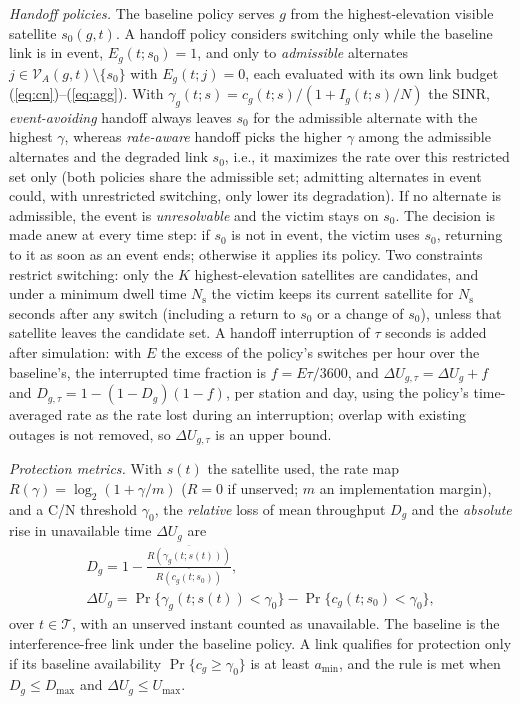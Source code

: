 \documentclass[conference]{IEEEtran}
\begin{document}
\emph{Handoff policies.} The baseline policy serves $g$ from the highest-elevation
visible satellite $s_0(g,t)$. A handoff policy considers switching only while the
baseline link is in event, $E_g(t;s_0)=1$, and only to \emph{admissible}
alternates $j \in \mathcal{V}_A(g,t)\setminus\{s_0\}$ with $E_g(t;j)=0$, each
evaluated with its own link budget (\ref{eq:cn})--(\ref{eq:agg}). With
$\gamma_g(t;s) = c_g(t;s)/(1+I_g(t;s)/N)$ the SINR,
\emph{event-avoiding} handoff always leaves $s_0$ for the admissible alternate
with the highest $\gamma$, whereas \emph{rate-aware} handoff picks the higher $\gamma$ among
the admissible alternates and the degraded link $s_0$, i.e., it maximizes the rate
over this restricted set only (both policies share the admissible set; admitting
alternates in event could, with unrestricted switching, only lower its degradation). If no alternate
is admissible, the event is \emph{unresolvable} and the victim stays on $s_0$.
The decision is made anew at every time step: if $s_0$ is not in event, the
victim uses $s_0$, returning to it as soon as an event ends; otherwise it applies
its policy. Two constraints restrict switching: only the $K$ highest-elevation
satellites are candidates, and under a minimum dwell time $N_{\text{s}}$ the victim
keeps its current satellite for $N_{\text{s}}$ seconds after any switch (including
a return to $s_0$ or a change of $s_0$), unless that satellite leaves the candidate set. A handoff interruption of $\tau$ seconds is added after
simulation: with $E$ the excess of the policy's switches per hour over the
baseline's, the interrupted time fraction is $f = E\tau/3600$, and
$\Delta U_{g,\tau} = \Delta U_g + f$ and $D_{g,\tau} = 1-(1-D_g)(1-f)$, per station
and day, using the policy's time-averaged rate as the rate lost during an
interruption; overlap with existing outages is
not removed, so $\Delta U_{g,\tau}$ is an upper bound.

\emph{Protection metrics.} With $s(t)$ the satellite used, the rate map
$R(\gamma) = \log_2(1+\gamma/m)$ ($R=0$ if unserved; $m$ an implementation
margin), and a C/N threshold $\gamma_0$, the \emph{relative} loss of mean
throughput $D_g$ and the \emph{absolute} rise in unavailable time $\Delta U_g$ are
\begin{gather}
D_g = 1 - \frac{\overline{R(\gamma_g(t;s(t)))}}{\overline{R(c_g(t;s_0))}},\label{eq:degr}\\
\Delta U_g = \Pr\{\gamma_g(t;s(t)) < \gamma_0\} - \Pr\{c_g(t;s_0) < \gamma_0\},
\label{eq:metrics}
\end{gather}
over $t\in\mathcal{T}$, with an unserved instant counted as unavailable. The baseline is the interference-free link
under the baseline policy. A link
qualifies for protection only if its baseline availability
$\Pr\{c_g \ge \gamma_0\}$ is at least $a_{\min}$, and the rule is met when
$D_g \le D_{\max}$ and $\Delta U_g \le U_{\max}$.
\end{document}
